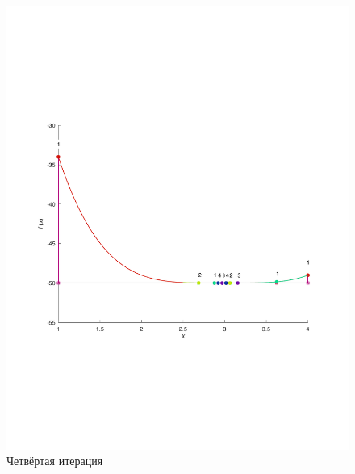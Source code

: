 \documentclass[a4paper,12pt]{article}
\begin{document}
    \begin{figure}[H]
        \centering
        \includegraphics[scale=0.4]{4Bolcanoitter.pdf}
        \caption{Четвёртая итерация}
    \end{figure} 
\end{document}
